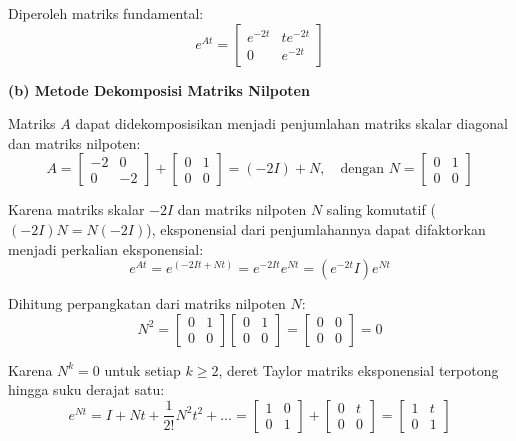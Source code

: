 \documentclass[11pt,a4paper]{article}
\begin{document}
Diperoleh matriks fundamental:
$$e^{At} = \begin{bmatrix} e^{-2t} & t e^{-2t} \\ 0 & e^{-2t} \end{bmatrix}$$

\textbf{(b) Metode Dekomposisi Matriks Nilpoten}

Matriks $A$ dapat didekomposisikan menjadi penjumlahan matriks skalar diagonal dan matriks nilpoten:
$$A = \begin{bmatrix} -2 & 0 \\ 0 & -2 \end{bmatrix} + \begin{bmatrix} 0 & 1 \\ 0 & 0 \end{bmatrix} = (-2I) + N, \quad \text{dengan } N = \begin{bmatrix} 0 & 1 \\ 0 & 0 \end{bmatrix}$$

Karena matriks skalar $-2I$ dan matriks nilpoten $N$ saling komutatif ($(-2I)N = N(-2I)$), eksponensial dari penjumlahannya dapat difaktorkan menjadi perkalian eksponensial:
$$e^{At} = e^{(-2I t + N t)} = e^{-2I t} e^{N t} = (e^{-2t} I) e^{Nt}$$

Dihitung perpangkatan dari matriks nilpoten $N$:
$$N^2 = \begin{bmatrix} 0 & 1 \\ 0 & 0 \end{bmatrix} \begin{bmatrix} 0 & 1 \\ 0 & 0 \end{bmatrix} = \begin{bmatrix} 0 & 0 \\ 0 & 0 \end{bmatrix} = 0$$

Karena $N^k = 0$ untuk setiap $k \ge 2$, deret Taylor matriks eksponensial terpotong hingga suku derajat satu:
$$e^{Nt} = I + N t + \frac{1}{2!} N^2 t^2 + \dots = \begin{bmatrix} 1 & 0 \\ 0 & 1 \end{bmatrix} + \begin{bmatrix} 0 & t \\ 0 & 0 \end{bmatrix} = \begin{bmatrix} 1 & t \\ 0 & 1 \end{bmatrix}$$
\end{document}
